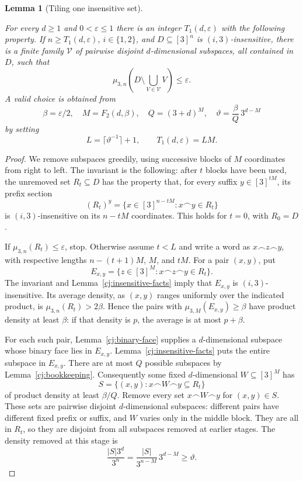 \documentclass[11pt]{amsart}
\newtheorem{lemma}[theorem]{Lemma}
\theoremstyle{definition}
\theoremstyle{remark}
\numberwithin{equation}{section}
\providecommand{\lean}[1]{}
\providecommand{\leanok}{}
\begin{document}
\begin{lemma}[Tiling one insensitive set]\label{cj:tile-one}
\lean{Auto.C_cj_tile_one,Auto.cj_tile_one}
\leanok
For every $d\ge1$ and $0<\varepsilon\le1$ there is an integer
$T_1(d,\varepsilon)$ with the following property.  If
$n\ge T_1(d,\varepsilon)$, $i\in\{1,2\}$, and
$D\subseteq[3]^n$ is $(i,3)$-insensitive, there is a finite family
$\mathcal V$ of pairwise disjoint $d$-dimensional subspaces, all
contained in $D$, such that
\[
 \mu_{3,n}\left(D\setminus\bigcup_{V\in\mathcal V}V\right)
 \le\varepsilon.
\]
A valid choice is obtained from
\[
 \beta=\varepsilon/2,\quad M=F_2(d,\beta),\quad Q=(3+d)^M,
 \quad \vartheta=\frac{\beta}{Q}\,3^{d-M}
\]
by setting
\[
 L=\lceil\vartheta^{-1}\rceil+1,
 \qquad T_1(d,\varepsilon)=LM.
\]
\end{lemma}
\begin{proof}
We remove subspaces greedily, using successive blocks of $M$
coordinates from right to left.  The invariant is the following:
after $t$ blocks have been used, the unremoved set $R_t\subseteq D$
has the property that, for every suffix $y\in[3]^{tM}$, its prefix
section
\[
 (R_t)^y=\{x\in[3]^{n-tM}:x\frown y\in R_t\}
\]
is $(i,3)$-insensitive on its $n-tM$ coordinates.  This holds for
$t=0$, with $R_0=D$.

If $\mu_{3,n}(R_t)\le\varepsilon$, stop.  Otherwise assume $t<L$
and write a word as $x\frown z\frown y$, with respective lengths
$n-(t+1)M$, $M$, and $tM$.  For a pair $(x,y)$, put
\[
 E_{x,y}=\{z\in[3]^M:x\frown z\frown y\in R_t\}.
\]
The invariant and Lemma~\ref{cj:insensitive-facts} imply that
$E_{x,y}$ is $(i,3)$-insensitive.  Its average density, as $(x,y)$
ranges uniformly over the indicated product, is
$\mu_{3,n}(R_t)>2\beta$.  Hence the pairs with
$\mu_{3,M}(E_{x,y})\ge\beta$ have product density at least $\beta$:
if that density is $p$, the average is at most $p+\beta$.

For each such pair, Lemma~\ref{cj:binary-face} supplies a
$d$-dimensional subspace whose binary face lies in $E_{x,y}$.
Lemma~\ref{cj:insensitive-facts} puts the entire subspace in
$E_{x,y}$.  There are at most $Q$ possible subspaces by
Lemma~\ref{cj:bookkeeping}.  Consequently some fixed
$d$-dimensional $W\subseteq[3]^M$ has
\[
 S=\{(x,y):x\frown W\frown y\subseteq R_t\}
\]
of product density at least $\beta/Q$.  Remove every set
$x\frown W\frown y$ for $(x,y)\in S$.  These sets are pairwise
disjoint $d$-dimensional subspaces: different pairs have different
fixed prefix or suffix, and $W$ varies only in the middle block.
They are all in $R_t$, so they are disjoint from all subspaces removed
at earlier stages.  The density removed at this stage is
\[
 \frac{|S|3^d}{3^n}
 =\frac{|S|}{3^{n-M}}\,3^{d-M}
 \ge\vartheta.
\]


\end{proof}
\end{document}

